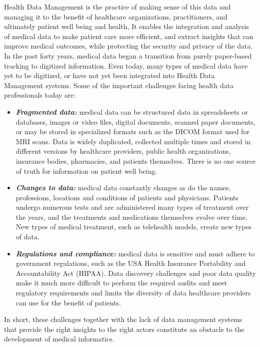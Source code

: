 Health Data Management is the practice of making sense of this data and managing it to the benefit of healthcare organizations, practitioners, and ultimately patient well being and health, It enables the integration and analysis of medical data to make patient care more efficient, and extract insights that can improve medical outcomes, while protecting the security and privacy of the data. In the past forty years, medical data began a transition from purely paper-based tracking to digitized information. Even today, many types of medical data have yet to be digitized, or have not yet been integrated into Health Data Management systems. Some of the important challenges facing health data professionals today are\cite{HealthDataManagement}:
\begin{itemize}
  \renewcommand{\labelitemi}{$\bullet$}
    \item \textbf{\textit{Fragmented data:}} medical data can be structured data in spreadsheets or databases, images or video files, digital documents, scanned paper documents, or may be stored in specialized formats such as the DICOM format used for MRI scans. Data is widely duplicated, collected multiple times and stored in different versions by healthcare providers, public health organizations, insurance bodies, pharmacies, and patients themselves. There is no one source of truth for information on patient well being.
    \item \textbf{\textit{Changes to data:}} medical data constantly changes as do the names, professions, locations and conditions of patients and physicians. Patients undergo numerous tests and are administered many types of treatment over the years, and the treatments and medications themselves evolve over time. New types of medical treatment, such as telehealth models, create new types of data.
    \item \textbf{\textit{Regulations and compliance:}} medical data is sensitive and must adhere to government regulations, such as the USA Health Insurance Portability and Accountability Act (HIPAA). Data discovery challenges and poor data quality make it much more difficult to perform the required audits and meet regulatory requirements and limits the diversity of data healthcare providers can use for the benefit of patients.
  \end{itemize}
  \bigbreak
  In short, these challenges together with the lack of data management systems that provide the right insights to the right actors constitute an obstacle to the development of medical informatics.




